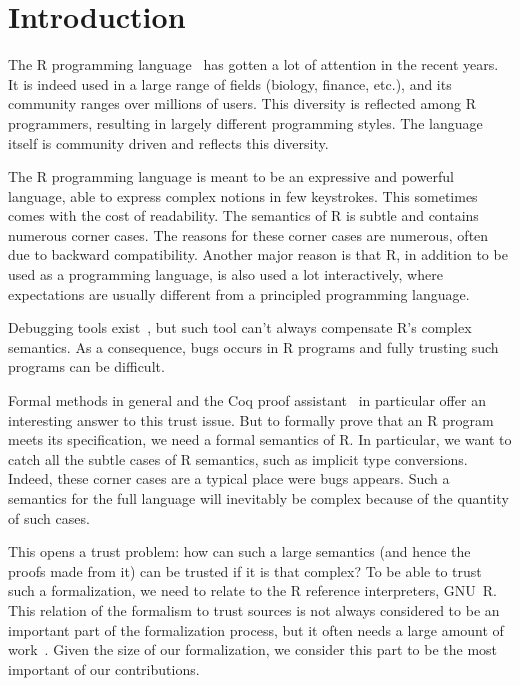 \documentclass[
    sigplan,
    10pt,
    review, %
    natbib=false %
 ]{acmart}
\newcommand{\mb}[1]{\todo[color=purple!20,size=\scriptsize]{#1}}
\begin{document}

\maketitle

\section{Introduction}
\label{sec:intro}

The R programming language~\parencite{R, ihaka1996r, Rwebsite}
has gotten a lot of attention in the recent years.
It is indeed used in a large range of fields (biology, finance, etc.),
and its community ranges over millions of users.
This diversity is reflected among R programmers,
resulting in largely different programming styles.
The language itself is community driven and reflects this diversity.

The R programming language is meant to be an expressive and powerful language,
able to express complex notions in few keystrokes.
This sometimes comes with the cost of readability.
The semantics of R is subtle and contains numerous corner cases.
The reasons for these corner cases are numerous,
often due to backward compatibility.
Another major reason is that R,
in addition to be used as a programming language,
is also used a lot interactively,
where expectations are usually different from a principled programming language.

\mb{An small example would be nice here.}
Debugging tools exist~\parencite{mcpherson2014},
but such tool can’t always compensate R’s complex semantics.
As a consequence, bugs occurs in R programs
and fully trusting such programs can be difficult.

Formal methods in general and the Coq proof assistant~\parencite{Coq}
in particular offer an interesting answer to this trust issue.
But to formally prove that an R program meets its specification,
we need a formal semantics of R.
In particular, we want to catch all the subtle cases of R semantics,
such as implicit type conversions.
Indeed, these corner cases are a typical place were bugs appears.
Such a semantics for the full language will inevitably be complex
because of the quantity of such cases.

This opens a trust problem:
how can such a large semantics (and hence the proofs made from it)
can be trusted if it is that complex?
To be able to trust such a formalization,
we need to relate to the R reference interpreters, GNU~R.
This relation of the formalism to trust sources
is not always considered to be an important part of the formalization process,
but it often needs a large amount of work~\parencite{leroy2014pip}.
Given the size of our formalization,
we consider this part to be the most important of our contributions.
\end{document}
